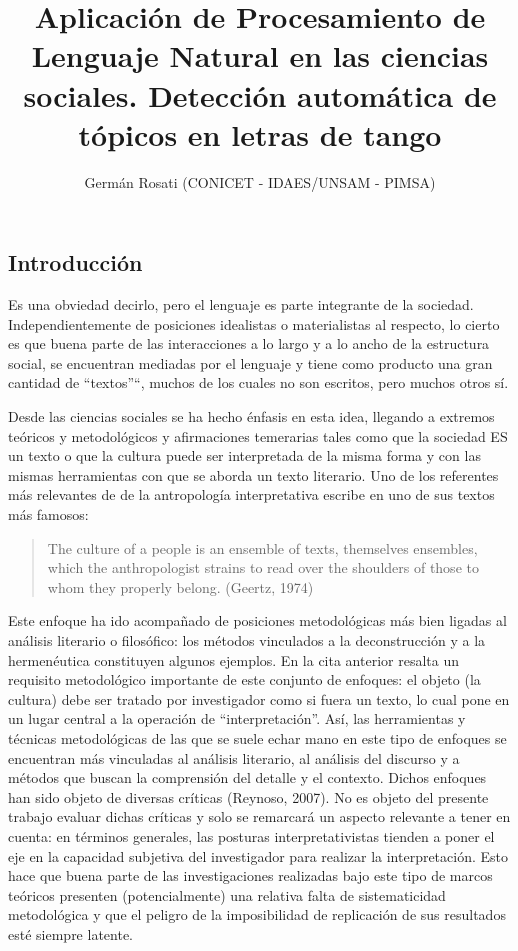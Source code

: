 \documentclass[]{article}
\title{Aplicación de Procesamiento de Lenguaje Natural en las ciencias
sociales. Detección automática de tópicos en letras de tango}
\author{Germán Rosati (CONICET - IDAES/UNSAM - PIMSA)}
\date{}
\begin{document}
\maketitle

\subsection{Introducción}\label{introducciuxf3n}

Es una obviedad decirlo, pero el lenguaje es parte integrante de la
sociedad. Independientemente de posiciones idealistas o materialistas al
respecto, lo cierto es que buena parte de las interacciones a lo largo y
a lo ancho de la estructura social, se encuentran mediadas por el
lenguaje y tiene como producto una gran cantidad de ``textos''``, muchos
de los cuales no son escritos, pero muchos otros sí.

Desde las ciencias sociales se ha hecho énfasis en esta idea, llegando a
extremos teóricos y metodológicos y afirmaciones temerarias tales como
que la sociedad ES un texto o que la cultura puede ser interpretada de
la misma forma y con las mismas herramientas con que se aborda un texto
literario. Uno de los referentes más relevantes de de la antropología
interpretativa escribe en uno de sus textos más famosos:

\begin{quote}
The culture of a people is an ensemble of texts, themselves ensembles,
which the anthropologist strains to read over the shoulders of those to
whom they properly belong. (Geertz, 1974)
\end{quote}

Este enfoque ha ido acompañado de posiciones metodológicas más bien
ligadas al análisis literario o filosófico: los métodos vinculados a la
deconstrucción y a la hermenéutica constituyen algunos ejemplos. En la
cita anterior resalta un requisito metodológico importante de este
conjunto de enfoques: el objeto (la cultura) debe ser tratado por
investigador como si fuera un texto, lo cual pone en un lugar central a
la operación de ``interpretación''. Así, las herramientas y técnicas
metodológicas de las que se suele echar mano en este tipo de enfoques se
encuentran más vinculadas al análisis literario, al análisis del
discurso y a métodos que buscan la comprensión del detalle y el
contexto. Dichos enfoques han sido objeto de diversas críticas (Reynoso,
2007). No es objeto del presente trabajo evaluar dichas críticas y solo
se remarcará un aspecto relevante a tener en cuenta: en términos
generales, las posturas interpretativistas tienden a poner el eje en la
capacidad subjetiva del investigador para realizar la interpretación.
Esto hace que buena parte de las investigaciones realizadas bajo este
tipo de marcos teóricos presenten (potencialmente) una relativa falta de
sistematicidad metodológica y que el peligro de la imposibilidad de
replicación de sus resultados esté siempre latente.
\end{document}
